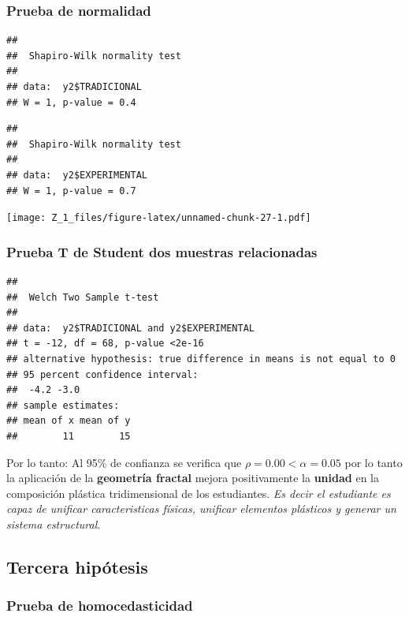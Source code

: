 \documentclass[12pt,]{report}
\begin{document}
\hypertarget{prueba-de-normalidad-1}{%
\subsubsection{Prueba de normalidad}\label{prueba-de-normalidad-1}}

\begin{verbatim}
## 
##  Shapiro-Wilk normality test
## 
## data:  y2$TRADICIONAL
## W = 1, p-value = 0.4
\end{verbatim}

\begin{verbatim}
## 
##  Shapiro-Wilk normality test
## 
## data:  y2$EXPERIMENTAL
## W = 1, p-value = 0.7
\end{verbatim}

\texttt{[image: Z\_1\_files/figure-latex/unnamed-chunk-27-1.pdf]}

\hypertarget{prueba-t-de-student-dos-muestras-relacionadas-1}{%
\subsubsection{Prueba T de Student dos muestras relacionadas}\label{prueba-t-de-student-dos-muestras-relacionadas-1}}

\begin{verbatim}
## 
##  Welch Two Sample t-test
## 
## data:  y2$TRADICIONAL and y2$EXPERIMENTAL
## t = -12, df = 68, p-value <2e-16
## alternative hypothesis: true difference in means is not equal to 0
## 95 percent confidence interval:
##  -4.2 -3.0
## sample estimates:
## mean of x mean of y 
##        11        15
\end{verbatim}

Por lo tanto: Al 95\% de confianza se verifica que \(\rho=0.00<\alpha=0.05\) por lo tanto la aplicación de la
\textbf{geometría fractal} mejora positivamente la \textbf{unidad} en la composición
plástica tridimensional de los estudiantes. \emph{Es decir el estudiante es capaz de unificar caracteristicas
físicas, unificar elementos plásticos y generar un sistema estructural}.

\hypertarget{tercera-hipuxf3tesis}{%
\subsection{Tercera hipótesis}\label{tercera-hipuxf3tesis}}

\hypertarget{prueba-de-homocedasticidad-2}{%
\subsubsection{Prueba de homocedasticidad}\label{prueba-de-homocedasticidad-2}}
\end{document}
